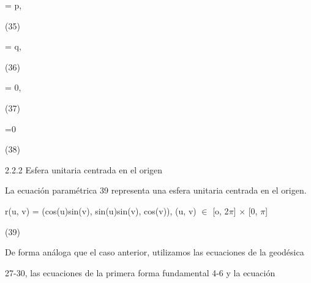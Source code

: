 \documentclass[a4paper,portrait,12pt]{article}
\begin{document}
\begin{flushleft}
= p,
\end{flushleft}





(35)





\begin{flushleft}
= q,
\end{flushleft}





(36)





= 0,





(37)





=0





(38)





\begin{flushleft}
2.2.2 Esfera unitaria centrada en el origen
\end{flushleft}


\begin{flushleft}
La ecuación paramétrica 39 representa una esfera unitaria centrada en el origen.
\end{flushleft}


\begin{flushleft}
r(u, v) = (cos(u)sin(v), sin(u)sin(v), cos(v)), (u, v) $\in$ [o, 2$\pi$] × [0, $\pi$]
\end{flushleft}





(39)





\begin{flushleft}
De forma análoga que el caso anterior, utilizamos las ecuaciones de la geodésica
\end{flushleft}


\begin{flushleft}
27-30, las ecuaciones de la primera forma fundamental 4-6 y la ecuación
\end{flushleft}
\end{document}

